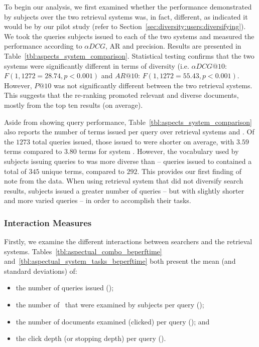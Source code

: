 To begin our analysis, we first examined whether the performance demonstrated by subjects over the two retrieval systems was, in fact, different, as indicated it would be by our pilot study (refer to Section~\ref{sec:diversity:users:diversifying}). We took the queries subjects issued to each of the two systems and measured the performance according to $\alpha DCG$, AR and precision. Results are presented in Table~\ref{tbl:aspects_system_comparison}. Statistical testing confirms that the two systems were significantly different in terms of diversity (i.e. $\alpha DCG@10$: $F(1, 1272=28.74, p<0.001)$ and $AR@10$: $F(1,1272 = 55.43, p<0.001)$. However, $P@10$ was not significantly different between the two retrieval systems. This suggests that the re-ranking promoted relevant and diverse documents, mostly from the top ten results (on average).

Aside from showing query performance, Table~\ref{tbl:aspects_system_comparison} also reports the number of terms issued per query over retrieval systems  and . Of the $1273$ total queries issued, those issued to  were shorter on average, with $3.59$ terms compared to $3.80$ terms for system . However, the vocabulary used by subjects issuing queries to  was more diverse than  -- queries issued to  contained a total of $345$ unique terms, compared to $292$. This provides our first finding of note from the data. When using retrieval system  that did not diversify search results, subjects issued a greater number of queries -- but with slightly shorter and more varied queries -- in order to accomplish their tasks.

\subsubsection{Interaction Measures}
Firstly, we examine the different interactions between searchers and the retrieval systems. Tables~\ref{tbl:aspectual_combo_beperftime} and~\ref{tbl:aspectual_system_tasks_beperftime} both present the mean (and standard deviations) of:

\begin{itemize}
    \item{the number of queries issued ();}
    \item{the number of~ that were examined by subjects per query ();}
    \item{the number of documents examined (clicked) per query (); and}
    \item{the click depth (or stopping depth) per query ().}
\end{itemize}

